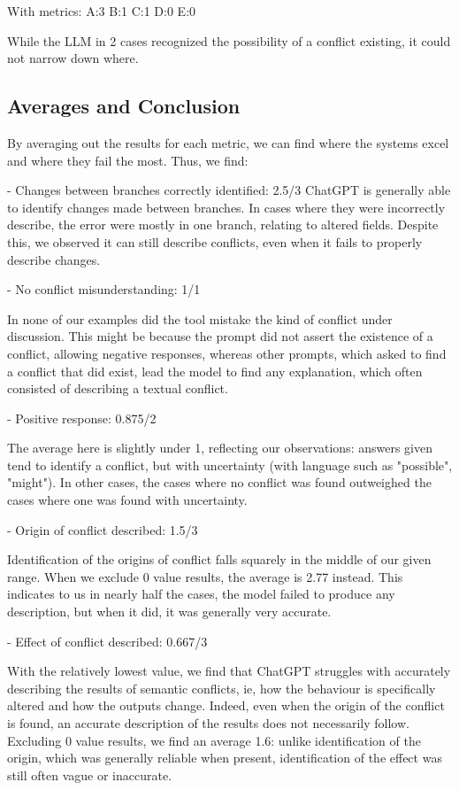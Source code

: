 With metrics:
A:3
B:1
C:1
D:0
E:0

While the LLM in 2 cases recognized the possibility of a conflict existing, it could not narrow down where.

\subsection{Averages and Conclusion}

By averaging out the results for each metric, we can find where the systems excel and where they fail the most. Thus, we find:

- Changes between branches correctly identified: 2.5/3
ChatGPT is generally able to identify changes made between branches. In cases where they were incorrectly describe, the error were mostly in one branch, relating to altered fields. Despite this, we observed it can still describe conflicts, even when it fails to properly describe changes.

- No conflict misunderstanding: 1/1

In none of our examples did the tool mistake the kind of conflict under discussion. This might be because the prompt did not assert the existence of a conflict, allowing negative responses, whereas other prompts, which asked to find a conflict that did exist, lead the model to find any explanation, which often consisted of describing a textual conflict.

- Positive response: 0.875/2

The average here is slightly under 1, reflecting our observations: answers given tend to identify a conflict, but with uncertainty (with language such as "possible", "might"). In other cases, the cases where no conflict was found outweighed the cases where one was found with uncertainty.

- Origin of conflict described: 1.5/3

Identification of the origins of conflict falls squarely in the middle of our given range.  When we exclude 0 value results, the average is 2.77 instead. This indicates to us in nearly half the cases, the model failed to produce any description, but when it did, it was generally very accurate.

- Effect of conflict described: 0.667/3

With the relatively lowest value, we find that ChatGPT struggles with accurately describing the results of semantic conflicts, ie, how the behaviour is specifically altered and how the outputs change. Indeed, even when the origin of the conflict is found, an accurate description of the results does not necessarily follow. Excluding 0 value results, we find an average 1.6: unlike identification of the origin, which was generally reliable when present, identification of the effect was still often vague or inaccurate.


